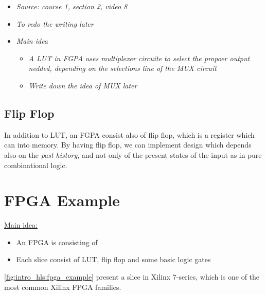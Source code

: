 \begin{itemize}

\item \textit{Source: course 1, section 2, video 8}

\item \textit{To redo the writing later}


\item \textit{Main idea}

	\begin{itemize}
	\item \textit{A LUT in FGPA uses multiplexer circuite to select the propoer output nedded, depending on the selections line of the MUX circuit}
	
	\item \textit{Write down the idea of MUX later}	
	
	\end{itemize}


\end{itemize}

\subsection{Flip Flop}
 
In addition to LUT, an FGPA consist also of flip flop, which is a register which can  into memory. By having flip flop, we can implement design which depends also on the \textit{past history}, and not only of the present states of the input as in pure combinational logic. 

\newpage 
\section{FPGA Example} 
 
\underline{Main idea:} 
 
\begin{itemize}

\item An FPGA is consisting of  

\item Each slice consist of LUT, flip flop and some basic logic gates

\end{itemize} 

\autoref{fig:intro_hls:fpga_example} present a slice in Xilinx 7-series, which is one of the most common Xilinx FPGA families. 
 
